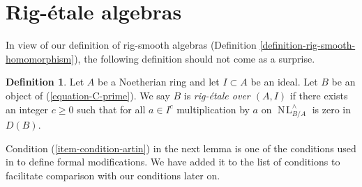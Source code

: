 \documentclass{stacks-project}
\theoremstyle{plain}
\theoremstyle{definition}
\newtheorem{definition}[subsection]{Definition}
\theoremstyle{remark}
\numberwithin{equation}{subsection}
\def\NL{\mathop{N\!L}\nolimits}
\begin{document}
\section{Rig-\'etale algebras}
\label{section-rig-etale}

\noindent
In view of our definition of rig-smooth algebras
(Definition \ref{definition-rig-smooth-homomorphism}),
the following definition should not come as a surprise.

\begin{definition}
\label{definition-rig-etale-homomorphism}
Let $A$ be a Noetherian ring and let $I \subset A$ be an ideal.
Let $B$ be an object of (\ref{equation-C-prime}). We say
$B$ is {\it rig-\'etale over $(A, I)$} if there exists an integer
$c \geq 0$ such that for all $a \in I^c$
multiplication by $a$ on $\NL_{B/A}^\wedge$
is zero in $D(B)$.
\end{definition}

\noindent
Condition (\ref{item-condition-artin}) in the next lemma is
one of the conditions used in \cite{ArtinII} to define formal modifications.
We have added it to the list of conditions to facilitate comparison
with our conditions later on.
\end{document}
